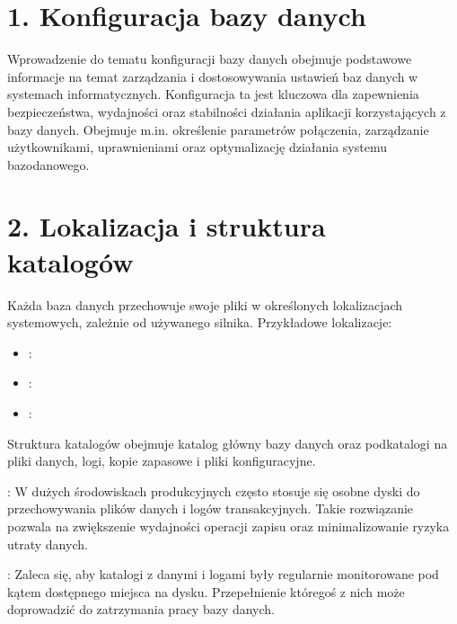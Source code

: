 \documentclass[a4paper,11pt,polish]{sphinxmanual}
\begin{document}
\section{1. Konfiguracja bazy danych}
\label{\detokenize{Konfiguracja_baz_danych/Konfiguracja_baz_danych:konfiguracja-bazy-danych}}
\sphinxAtStartPar
Wprowadzenie do tematu konfiguracji bazy danych obejmuje podstawowe informacje na temat zarządzania i dostosowywania ustawień baz danych w systemach informatycznych. Konfiguracja ta jest kluczowa dla zapewnienia bezpieczeństwa, wydajności oraz stabilności działania aplikacji korzystających z bazy danych. Obejmuje m.in. określenie parametrów połączenia, zarządzanie użytkownikami, uprawnieniami oraz optymalizację działania systemu bazodanowego.


\section{2. Lokalizacja i struktura katalogów}
\label{\detokenize{Konfiguracja_baz_danych/Konfiguracja_baz_danych:lokalizacja-i-struktura-katalogow}}
\sphinxAtStartPar
Każda baza danych przechowuje swoje pliki w określonych lokalizacjach systemowych, zależnie od używanego silnika. Przykładowe lokalizacje:
\begin{itemize}
\item {} 
\sphinxAtStartPar
{}: 

\item {} 
\sphinxAtStartPar
{}: 

\item {} 
\sphinxAtStartPar
{}: 

\end{itemize}

\sphinxAtStartPar
Struktura katalogów obejmuje katalog główny bazy danych oraz podkatalogi na pliki danych, logi, kopie zapasowe i pliki konfiguracyjne.

\sphinxAtStartPar
{}: W dużych środowiskach produkcyjnych często stosuje się osobne dyski do przechowywania plików danych i logów transakcyjnych. Takie rozwiązanie pozwala na zwiększenie wydajności operacji zapisu oraz minimalizowanie ryzyka utraty danych.

\sphinxAtStartPar
{}: Zaleca się, aby katalogi z danymi i logami były regularnie monitorowane pod kątem dostępnego miejsca na dysku. Przepełnienie któregoś z nich może doprowadzić do zatrzymania pracy bazy danych.
\end{document}
